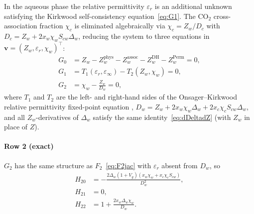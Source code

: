\documentclass[preprint,12pt,authoryear]{elsarticle}
\begin{document}
In the aqueous phase the relative permittivity $\varepsilon_r$ is an additional
unknown satisfying the Kirkwood self-consistency equation~\eqref{eq:G1}.
The CO$_2$ cross-association fraction $\chi_c$ is eliminated algebraically via
$\chi_c = Z_w/D_c$ with $D_c = Z_w + 2x_w\chi_w S_{cw}\Delta_w$, reducing the
system to three equations in $\mathbf{v}=(Z_w,\varepsilon_r,\chi_w)^\top$:
\begin{align}
  G_0 &= Z_w - Z_w^{\text{phys}} - Z_w^{\text{assoc}}
              - Z_w^{\text{DH}} - Z_w^{\text{Perm}} = 0, \label{eq:G0} \\
  G_1 &= T_1(\varepsilon_r,\varepsilon_\infty)
        - T_2(Z_w,\chi_w) = 0, \label{eq:G1} \\
  G_2 &= \chi_w - \frac{Z_w}{D_w} = 0, \label{eq:G2}
\end{align}
where $T_1$ and $T_2$ are the left- and right-hand sides of the
Onsager--Kirkwood relative permittivity fixed-point equation \citep{Coelho2025},
$D_w = Z_w + 2x_w\chi_w\Delta_w + 2x_c\chi_c S_{cw}\Delta_w$, and all
$Z_w$-derivatives of $\Delta_w$ satisfy the same identity~\eqref{eq:dDeltadZ}
(with $Z_w$ in place of $Z$).

\paragraph{Row 2 (exact)}
$G_2$ has the same structure as $F_2$~\eqref{eq:F2jac} with $\varepsilon_r$
absent from $D_w$, so
\begin{align}
  H_{20} &= -\frac{2\Delta_w(1+V_g)(x_w\chi_w + x_c\chi_c S_{cw})}{D_w^2},
             \label{eq:H20} \\
  H_{21} &= 0, \label{eq:H21} \\
  H_{22} &= 1 + \frac{2x_w\Delta_w\chi_w}{D_w}. \label{eq:H22}
\end{align}
\end{document}
